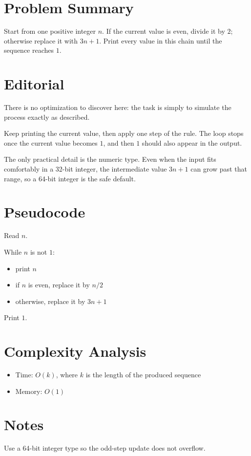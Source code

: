 \section{Problem Summary}
Start from one positive integer \(n\). If the current value is even, divide it by \(2\); otherwise replace it with \(3n + 1\). Print every value in this chain until the sequence reaches \(1\).

\section{Editorial}
There is no optimization to discover here: the task is simply to simulate the process exactly as described.

Keep printing the current value, then apply one step of the rule. The loop stops once the current value becomes \(1\), and then \(1\) should also appear in the output.

The only practical detail is the numeric type. Even when the input fits comfortably in a 32-bit integer, the intermediate value \(3n + 1\) can grow past that range, so a 64-bit integer is the safe default.

\section{Pseudocode}
Read \(n\).

While \(n\) is not \(1\):
\begin{itemize}
\item print \(n\)
\item if \(n\) is even, replace it by \(n / 2\)
\item otherwise, replace it by \(3n + 1\)
\end{itemize}

Print \(1\).

\section{Complexity Analysis}
\begin{itemize}
\item Time: \(O(k)\), where \(k\) is the length of the produced sequence
\item Memory: \(O(1)\)
\end{itemize}

\section{Notes}
Use a 64-bit integer type so the odd-step update does not overflow.
